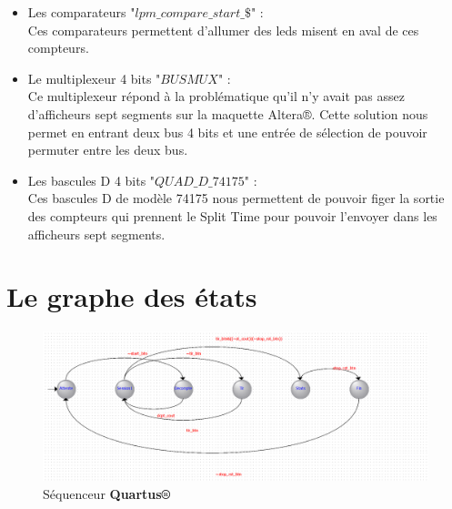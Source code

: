 \documentclass{rapport}
\begin{document}
\begin{itemize}
    \item Les comparateurs "$lpm\_compare\_start\_\$$" : \\
    Ces comparateurs permettent d'allumer des leds misent en aval de ces compteurs. \\

    \item Le multiplexeur 4 bits "$BUSMUX$" : \\
    Ce multiplexeur répond à la problématique qu'il n'y avait pas assez d'afficheurs sept segments sur la maquette Altera®. Cette solution nous permet en entrant deux bus 4 bits et une entrée de sélection de pouvoir permuter entre les deux bus. \\

    \item Les bascules D 4 bits "$QUAD\_D\_74175$" : \\
    Ces bascules D de modèle 74175 nous permettent de pouvoir figer la sortie des compteurs qui prennent le Split Time pour pouvoir l'envoyer dans les afficheurs sept segments.
    
\end{itemize}

\newpage

\section{Le graphe des états}

\begin{figure}[h!]

    \centering

    \includegraphics[width=1\textwidth]{src/seq_part.png}

    \caption{Séquenceur \textbf{Quartus®}}

    \label{fig:functional_diagram}

\end{figure}
\end{document}
